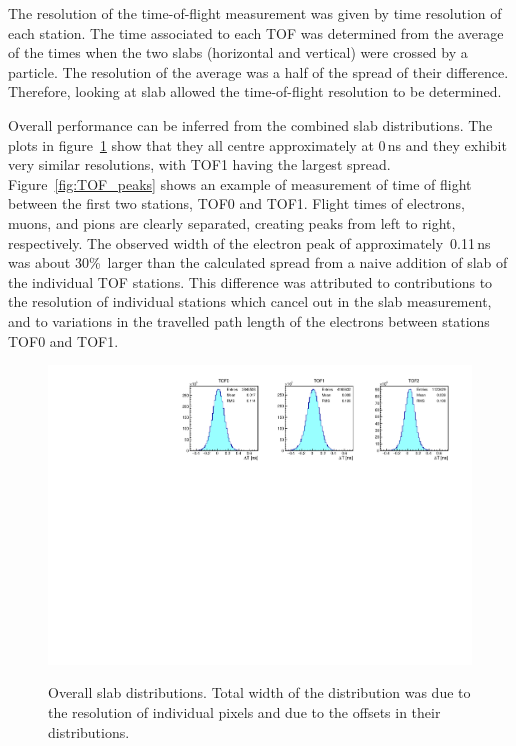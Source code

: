 The resolution of the time-of-flight measurement was given by time resolution
of each station.
The time associated to each TOF was determined from the average of the times when the two slabs (horizontal and vertical) were crossed by a particle.
The resolution of the average was a half of the spread of their difference. Therefore, looking at slab \DT{} allowed the time-of-flight
resolution to be determined.


Overall performance can be inferred from the combined slab \DT{}
distributions. The plots in figure~\ref{fig:SlabDtAll} show that they
all centre approximately at 0\,ns and they exhibit very similar
resolutions, with TOF1 having the largest spread.
Figure~\ref{fig:TOF_peaks} shows an example of measurement of time of
flight between the first two stations, TOF0 and TOF1. Flight times of electrons,
muons, and pions are clearly separated, creating peaks from left to
right, respectively. The observed width of the electron peak of
approximately~0.11\,ns was about 30\%~larger than the calculated spread from a
naive addition of slab \DT{} of the individual TOF stations.
This difference was attributed to contributions to the resolution of
individual stations which cancel out in the slab \DT{} measurement,
and to variations in the travelled path length of the electrons between
stations TOF0 and TOF1.

\begin{figure}
  \begin{center}
  \includegraphics[width=0.9\columnwidth]{07_overall_slab_dt} \\
  \caption{Overall slab \DT{} distributions. Total width of the
    distribution was due to the resolution of individual pixels and due to
    the offsets in their \DT{} distributions.}
  \label{fig:SlabDtAll}
  \end{center}
\end{figure}

